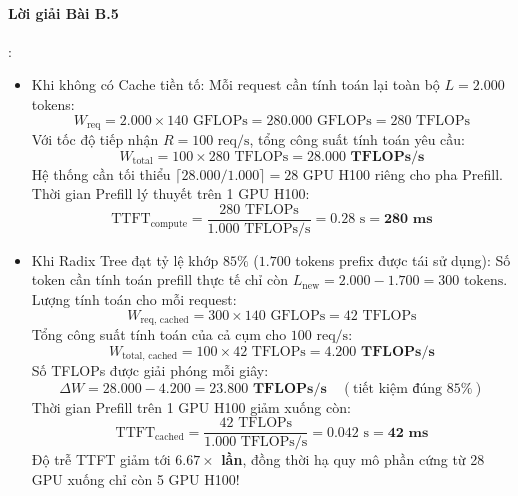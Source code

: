 \paragraph{Lời giải Bài B.5}:
\begin{itemize}
  \item[a)] Khi không có Cache tiền tố:
  Mỗi request cần tính toán lại toàn bộ $L = 2.000$ tokens:
  \begin{equation*}
  W_{\text{req}} = 2.000 \times 140\text{ GFLOPs} = 280.000\text{ GFLOPs} = 280\text{ TFLOPs}
  \end{equation*}
  Với tốc độ tiếp nhận $R = 100\text{ req/s}$, tổng công suất tính toán yêu cầu:
  \begin{equation*}
  W_{\text{total}} = 100 \times 280\text{ TFLOPs} = \mathbf{28.000\text{ TFLOPs/s}}
  \end{equation*}
  Hệ thống cần tối thiểu $\lceil 28.000 / 1.000 \rceil = 28$ GPU H100 riêng cho pha Prefill.
  Thời gian Prefill lý thuyết trên 1 GPU H100:
  \begin{equation*}
  \text{TTFT}_{\text{compute}} = \frac{280\text{ TFLOPs}}{1.000\text{ TFLOPs/s}} = 0.28\text{ s} = \mathbf{280\text{ ms}}
  \end{equation*}

  \item[b)] Khi Radix Tree đạt tỷ lệ khớp $85\%$ ($1.700$ tokens prefix được tái sử dụng):
  Số token cần tính toán prefill thực tế chỉ còn $L_{\text{new}} = 2.000 - 1.700 = 300\text{ tokens}$.
  Lượng tính toán cho mỗi request:
  \begin{equation*}
  W_{\text{req, cached}} = 300 \times 140\text{ GFLOPs} = 42\text{ TFLOPs}
  \end{equation*}
  Tổng công suất tính toán của cả cụm cho $100\text{ req/s}$:
  \begin{equation*}
  W_{\text{total, cached}} = 100 \times 42\text{ TFLOPs} = \mathbf{4.200\text{ TFLOPs/s}}
  \end{equation*}
  Số TFLOPs được giải phóng mỗi giây:
  \begin{equation*}
  \Delta W = 28.000 - 4.200 = \mathbf{23.800\text{ TFLOPs/s}}\quad (\text{tiết kiệm đúng } 85\%)
  \end{equation*}
  Thời gian Prefill trên 1 GPU H100 giảm xuống còn:
  \begin{equation*}
  \text{TTFT}_{\text{cached}} = \frac{42\text{ TFLOPs}}{1.000\text{ TFLOPs/s}} = 0.042\text{ s} = \mathbf{42\text{ ms}}
  \end{equation*}
  Độ trễ TTFT giảm tới \textbf{$6.67\times$ lần}, đồng thời hạ quy mô phần cứng từ 28 GPU xuống chỉ còn 5 GPU H100!
\end{itemize}

